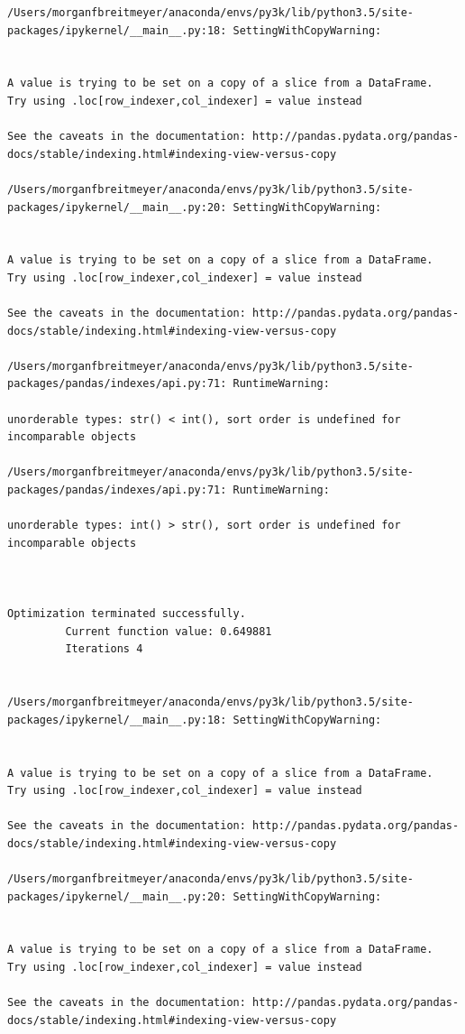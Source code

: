\begin{lstlisting}
/Users/morganfbreitmeyer/anaconda/envs/py3k/lib/python3.5/site-packages/ipykernel/__main__.py:18: SettingWithCopyWarning:


A value is trying to be set on a copy of a slice from a DataFrame.
Try using .loc[row_indexer,col_indexer] = value instead

See the caveats in the documentation: http://pandas.pydata.org/pandas-docs/stable/indexing.html#indexing-view-versus-copy

/Users/morganfbreitmeyer/anaconda/envs/py3k/lib/python3.5/site-packages/ipykernel/__main__.py:20: SettingWithCopyWarning:


A value is trying to be set on a copy of a slice from a DataFrame.
Try using .loc[row_indexer,col_indexer] = value instead

See the caveats in the documentation: http://pandas.pydata.org/pandas-docs/stable/indexing.html#indexing-view-versus-copy

/Users/morganfbreitmeyer/anaconda/envs/py3k/lib/python3.5/site-packages/pandas/indexes/api.py:71: RuntimeWarning:

unorderable types: str() < int(), sort order is undefined for incomparable objects

/Users/morganfbreitmeyer/anaconda/envs/py3k/lib/python3.5/site-packages/pandas/indexes/api.py:71: RuntimeWarning:

unorderable types: int() > str(), sort order is undefined for incomparable objects



Optimization terminated successfully.
         Current function value: 0.649881
         Iterations 4


/Users/morganfbreitmeyer/anaconda/envs/py3k/lib/python3.5/site-packages/ipykernel/__main__.py:18: SettingWithCopyWarning:


A value is trying to be set on a copy of a slice from a DataFrame.
Try using .loc[row_indexer,col_indexer] = value instead

See the caveats in the documentation: http://pandas.pydata.org/pandas-docs/stable/indexing.html#indexing-view-versus-copy

/Users/morganfbreitmeyer/anaconda/envs/py3k/lib/python3.5/site-packages/ipykernel/__main__.py:20: SettingWithCopyWarning:


A value is trying to be set on a copy of a slice from a DataFrame.
Try using .loc[row_indexer,col_indexer] = value instead

See the caveats in the documentation: http://pandas.pydata.org/pandas-docs/stable/indexing.html#indexing-view-versus-copy


\end{lstlisting}
